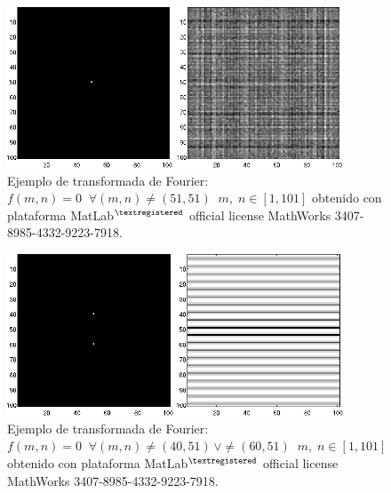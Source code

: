 \begin{center}
\begin{figure} [!h]

\centering
\includegraphics[width=10cm]{figures/Fig2_3.png}

\caption{Ejemplo de transformada de Fourier: $f(m, n) = 0 \; \; \forall (m, n) \neq (51, 51) \; \;  m, \; n \in [1, 101]$
         obtenido con plataforma MatLab$^{\textregistered}$ official license MathWorks 3407-8985-4332-9223-7918.}
\label{Fig2_3}

\end{figure}
\end{center}

\vspace{1.0cm}

\begin{center}
\begin{figure} [!h]

\centering
\includegraphics[width=10cm]{figures/Fig2_4.png}

\caption{Ejemplo de transformada de Fourier: $f(m, n) = 0 \; \; \forall (m, n) \neq (40, 51) \, \vee \neq (60, 51) \; \;  m, \; n \in [1, 101]$
         obtenido con plataforma MatLab$^{\textregistered}$ official license MathWorks 3407-8985-4332-9223-7918.}
\label{Fig2_4}

\end{figure}
\end{center}

\vspace{1.0cm}

